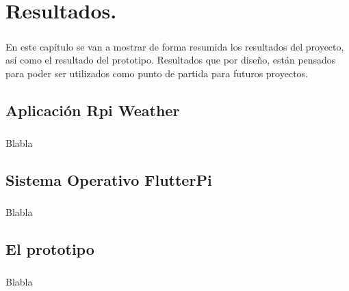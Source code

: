 \chapter{Resultados.}\label{sec:resultados}

\paragraph{}En este capítulo se van a mostrar de forma resumida los resultados del proyecto,
así como el resultado del prototipo. Resultados que por diseño, están pensados para
poder ser utilizados como punto de partida para futuros proyectos.

\section{Aplicación Rpi Weather}\label{sec:rpiweather}

\paragraph{}Blabla

\section{Sistema Operativo FlutterPi}\label{sec:flutterpi}

\paragraph{}Blabla

\section{El prototipo}\label{sec:prototipo}

\paragraph{}Blabla

